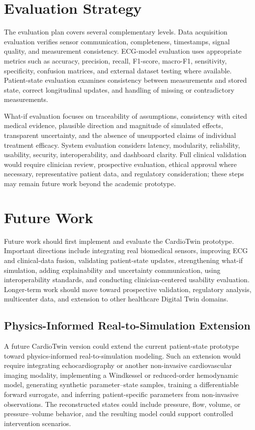 \section{Evaluation Strategy}
The evaluation plan covers several complementary levels. Data acquisition evaluation verifies sensor communication, completeness, timestamps, signal quality, and measurement consistency. ECG-model evaluation uses appropriate metrics such as accuracy, precision, recall, F1-score, macro-F1, sensitivity, specificity, confusion matrices, and external dataset testing where available. Patient-state evaluation examines consistency between measurements and stored state, correct longitudinal updates, and handling of missing or contradictory measurements.

What-if evaluation focuses on traceability of assumptions, consistency with cited medical evidence, plausible direction and magnitude of simulated effects, transparent uncertainty, and the absence of unsupported claims of individual treatment efficacy. System evaluation considers latency, modularity, reliability, usability, security, interoperability, and dashboard clarity. Full clinical validation would require clinician review, prospective evaluation, ethical approval where necessary, representative patient data, and regulatory consideration; these steps may remain future work beyond the academic prototype.

\section{Future Work}
Future work should first implement and evaluate the CardioTwin prototype. Important directions include integrating real biomedical sensors, improving ECG and clinical-data fusion, validating patient-state updates, strengthening what-if simulation, adding explainability and uncertainty communication, using interoperability standards, and conducting clinician-centered usability evaluation. Longer-term work should move toward prospective validation, regulatory analysis, multicenter data, and extension to other healthcare Digital Twin domains.

\subsection{Physics-Informed Real-to-Simulation Extension}
A future CardioTwin version could extend the current patient-state prototype toward physics-informed real-to-simulation modeling. Such an extension would require integrating echocardiography or another non-invasive cardiovascular imaging modality, implementing a Windkessel or reduced-order hemodynamic model, generating synthetic parameter--state samples, training a differentiable forward surrogate, and inferring patient-specific parameters from non-invasive observations. The reconstructed states could include pressure, flow, volume, or pressure--volume behavior, and the resulting model could support controlled intervention scenarios.

